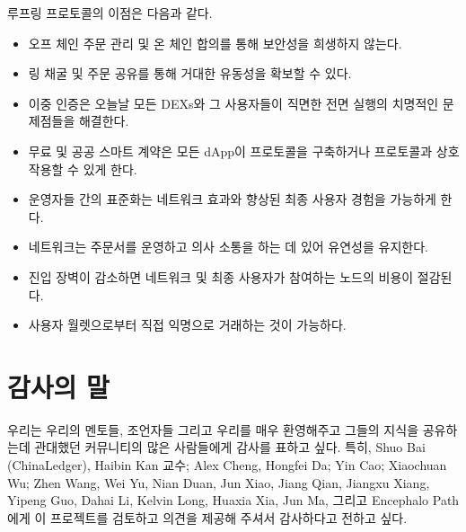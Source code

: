 \documentclass{article}
\begin{document}
\begin{multicols}{2}
루프링 프로토콜의 이점은 다음과 같다.

\begin{itemize}
      \item 오프 체인 주문 관리 및 온 체인 합의를 통해 보안성을 희생하지 않는다.
      \item 링 채굴 및 주문 공유를 통해 거대한 유동성을 확보할 수 있다.
      \item 이중 인증은 오늘날 모든 DEXs와 그 사용자들이 직면한 전면 실행의 치명적인 문제점들을 해결한다.
      \item 무료 및 공공 스마트 계약은 모든 dApp이 프로토콜을 구축하거나 프로토콜과 상호 작용할 수 있게 한다.
      \item 운영자들 간의 표준화는 네트워크 효과와 향상된 최종 사용자 경험을 가능하게 한다.
      \item 네트워크는 주문서를 운영하고 의사 소통을 하는 데 있어 유연성을 유지한다.
      \item 진입 장벽이 감소하면 네트워크 및 최종 사용자가 참여하는 노드의 비용이 절감된다.
      \item 사용자 월렛으로부터 직접 익명으로 거래하는 것이 가능하다.
      
\end{itemize}



\section{감사의 말}
우리는 우리의 멘토들, 조언자들 그리고 우리를 매우 환영해주고 그들의 지식을 공유하는데 관대했던 커뮤니티의 많은 사람들에게 감사를 표하고 싶다. 특히, Shuo Bai (ChinaLedger), Haibin Kan 교수; Alex Cheng, Hongfei Da; Yin Cao; Xiaochuan Wu; Zhen Wang, Wei Yu, Nian Duan, Jun Xiao, Jiang Qian, Jiangxu Xiang, Yipeng Guo, Dahai Li, Kelvin Long, Huaxia Xia, Jun Ma, 그리고 Encephalo Path에게 이 프로젝트를 검토하고 의견을 제공해 주셔서 감사하다고 전하고 싶다.






\end{multicols}

%


%

\end{document}
